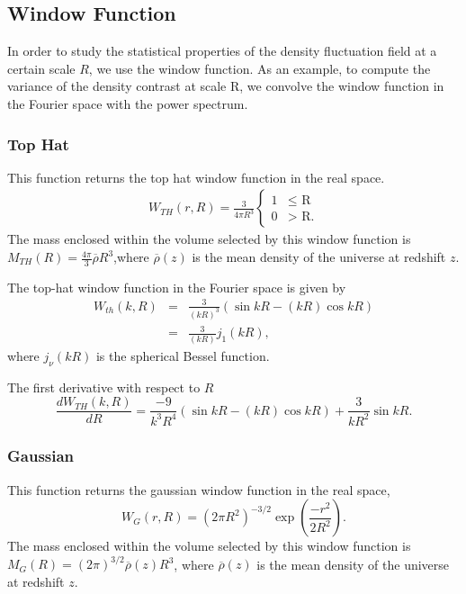 \documentclass[a4paper,twocolumn]{article}
\begin{document}
\subsection{Window Function}
\hypertarget{sec_wf}{}
In order to study the statistical properties of the density fluctuation field at a certain 
scale $R$, we use the window function. As an example, to compute the variance of the density 
contrast at scale R, we convolve the window function in the Fourier space with the power spectrum.

\subsubsection{Top Hat}
\hypertarget{sec_wf_th}{}
This function returns the top hat window function in the real space.
\hypertarget{eq_th_real}{}
\begin{eqnarray}
  W_{TH}(r, R) = \frac{3}{4\pi R^3} \left\{ \begin{array} {ll}
         1 & \mbox{$\leq$ R}\\
        0 & \mbox{$>$ R.}
         \end{array} \right.
\end{eqnarray}
The mass enclosed within the volume selected by this window function is $M_{TH}(R)= 
\frac{4\pi}{3}\overline{\rho} R^3$,where $\overline{\rho}(z)$ is the mean density of the 
universe at redshift $z$.

The top-hat window function in the Fourier space is given by
\hypertarget{eq_th_fourier}{}
\begin{eqnarray}
W_{th}(k, R) &=& \frac{3}{(kR)^3}(\sin kR - (kR)\cos kR) \\
            &=& \frac{3}{(kR)} j_1(kR),
\end{eqnarray}
where $j_\nu(kR)$ is the spherical Bessel function. 

The first derivative with respect to $R$
\hypertarget{eq_th_fourier_der}{}
\begin{equation}
\frac{dW_{TH}(k, R)}{dR} = \frac{-9}{k^3 R^4} (\sin kR - (kR)\cos kR) + \frac{3}{k R^2} \sin kR.
\end{equation}

\subsubsection{Gaussian}
\hypertarget{sec_wf_gauss}{}
This function returns the gaussian window function in the real space,
\hypertarget{eq_gauss_real}{}
\begin{equation}
W_G(r, R) = (2 \pi R^2)^{-3/2}\exp \left( \frac{-r^2}{2 R^2} \right).
\end{equation}
The mass enclosed within the volume selected by this window function is 
 $ M_G(R) = (2\pi)^{3/2}\overline{\rho}(z) R^3$, where $\overline{\rho}(z)$
 is the mean density of the universe at redshift $z$.
 
\end{document}
